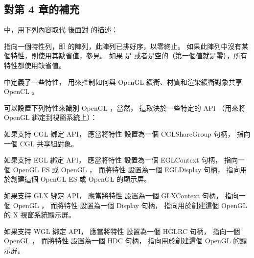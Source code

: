 \subsection{對第 4 章的補充}

中，用下列內容取代  後面對  的描述：

 指向一個特性列，即  的陣列，此陣列已排好序，以零終止。
如果此陣列中沒有某個特性，則使用其缺省值，參見。
如果  是  或者是空的（第一個值就是零），所有特性都使用缺省值。

中定義了一些特性，
用來控制如何與 OpenGL 緩衝、材質和渲染緩衝對象共享 OpenCL 。

可以設置下列特性來識別 OpenGL ，當然，
這取決於一些特定的 API （用來將 OpenGL 綁定到視窗系統上）：
\startigBase
\item 如果支持 CGL 綁定 API，
應當將特性  設置為一個 CGLShareGroup 句柄，
指向一個 CGL 共享組對象。

\item 如果支持 EGL 綁定 API，
應當將特性  設置為一個 EGLContext 句柄，
指向一個 OpenGL ES 或 OpenGL ，
而將特性  設置為一個 EGLDisplay 句柄，
指向用於創建這個 OpenGL ES 或 OpenGL 的顯示屏。

\item 如果支持 GLX 綁定 API，
應當將特性  設置為一個 GLXContext 句柄，
指向一個 OpenGL ，
而將特性  設置為一個 Display 句柄，
指向用於創建這個 OpenGL 的 X 視窗系統顯示屏。

\item 如果支持 WGL 綁定 API，
應當將特性  設置為一個 HGLRC 句柄，
指向一個 OpenGL ，
而將特性  設置為一個 HDC 句柄，
指向用於創建這個 OpenGL 的顯示屏。
\stopigBase

